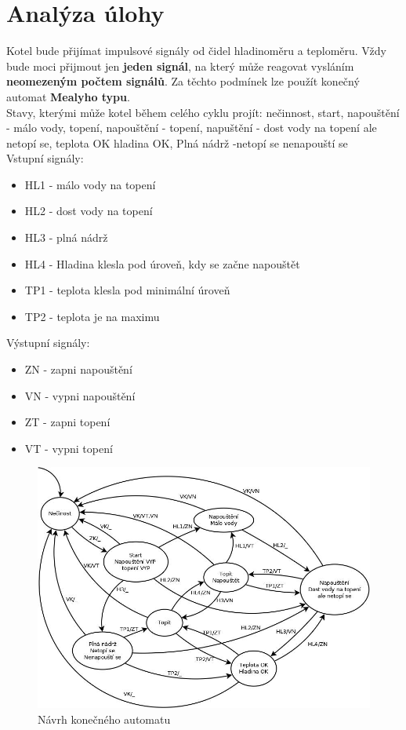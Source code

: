 \documentclass[12pt]{report}
\begin{document}
\chapter{Analýza úlohy}
Kotel bude přijímat impulsové signály od čidel hladinoměru a teploměru. Vždy bude moci přijmout jen \textbf{jeden signál}, na který může reagovat vysláním \textbf{neomezeným počtem signálů}.
Za těchto podmínek lze použít konečný automat \textbf{Mealyho typu}.\\
Stavy, kterými může kotel během celého cyklu projít: nečinnost, start, napouštění - málo vody, topení, napouštění - topení, napuštění - dost vody na topení ale netopí se, teplota OK hladina OK, Plná nádrž -netopí se nenapouští se\\

Vstupní signály: 
\begin{itemize}
\item HL1 - málo vody na topení
\item HL2 - dost vody na topení
\item HL3 - plná nádrž
\item HL4 - Hladina klesla pod úroveň, kdy se začne napouštět
\item TP1 - teplota klesla pod minimální úroveň
\item TP2 - teplota je na maximu
\end{itemize}

Výstupní signály: 
\begin{itemize}
\item ZN - zapni napouštění
\item VN - vypni napouštění
\item ZT - zapni topení
\item VT - vypni topení
\end{itemize}



\begin{figure}[h]
		\centering
		\includegraphics[width=\textwidth]{./images/graf.png}	
		\caption{Návrh konečného automatu}
\end{figure}
\end{document}
